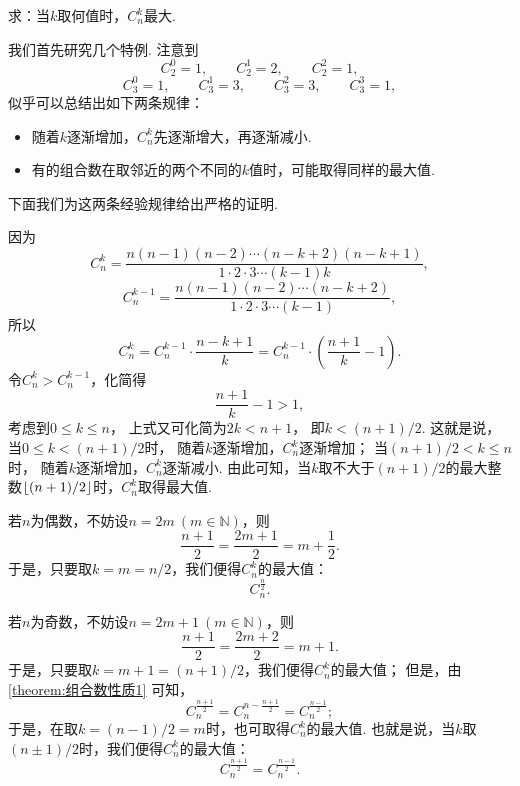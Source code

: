 \begin{example}
求：当\(k\)取何值时，\(C_n^k\)最大.
\begin{solution}
我们首先研究几个特例.
注意到\begin{equation*}
	C_2^0 = 1, \qquad
	C_2^1 = 2, \qquad
	C_2^2 = 1,
\end{equation*}\begin{equation*}
	C_3^0 = 1, \qquad
	C_3^1 = 3, \qquad
	C_3^2 = 3, \qquad
	C_3^3 = 1,
\end{equation*}
似乎可以总结出如下两条规律：
\begin{itemize}
	\item 随着\(k\)逐渐增加，\(C_n^k\)先逐渐增大，再逐渐减小.
	\item 有的组合数在取邻近的两个不同的\(k\)值时，可能取得同样的最大值.
\end{itemize}
下面我们为这两条经验规律给出严格的证明.

因为\begin{equation*}
	C_n^k = \frac{n(n-1)(n-2)\dotsm(n-k+2)(n-k+1)}{1\cdot2\cdot3\dotsm(k-1)k},
\end{equation*}\begin{equation*}
	C_n^{k-1} = \frac{n(n-1)(n-2)\dotsm(n-k+2)}{1\cdot2\cdot3\dotsm(k-1)},
\end{equation*}
所以\begin{equation*}
	C_n^k = C_n^{k-1} \cdot \frac{n-k+1}{k}
	= C_n^{k-1} \cdot \left( \frac{n+1}{k} - 1 \right).
\end{equation*}
令\(C_n^k > C_n^{k-1}\)，化简得\begin{equation*}
	\frac{n+1}{k} - 1 > 1,
\end{equation*}
考虑到\(0 \leq k \leq n\)，
上式又可化简为\(2k < n+1\)，
即\(k < (n+1)/2\).
这就是说，当\(0 \leq k < (n+1)/2\)时，
随着\(k\)逐渐增加，\(C_n^k\)逐渐增加；
当\((n+1)/2 < k \leq n\)时，
随着\(k\)逐渐增加，\(C_n^k\)逐渐减小.
由此可知，当\(k\)取不大于\((n+1)/2\)的最大整数\(\lfloor(n+1)/2\rfloor\)时，\(C_n^k\)取得最大值.

若\(n\)为偶数，不妨设\(n = 2m\ (m\in\mathbb{N})\)，则\begin{equation*}
	\frac{n+1}{2} = \frac{2m+1}{2}
	= m+\frac{1}{2}.
\end{equation*}
于是，只要取\(k = m = n/2\)，我们便得\(C_n^k\)的最大值：\begin{equation*}
	C_n^{\frac{n}{2}}.
\end{equation*}

若\(n\)为奇数，不妨设\(n = 2m+1\ (m\in\mathbb{N})\)，则\begin{equation*}
	\frac{n+1}{2} = \frac{2m+2}{2} = m+1.
\end{equation*}
于是，只要取\(k = m+1 = (n+1)/2\)，我们便得\(C_n^k\)的最大值；
但是，由\cref{theorem:组合数性质1} 可知，\begin{equation*}
	C_n^{\frac{n+1}{2}}
	= C_n^{n-\frac{n+1}{2}}
	= C_n^{\frac{n-1}{2}};
\end{equation*}
于是，在取\(k = (n-1)/2 = m\)时，也可取得\(C_n^k\)的最大值.
也就是说，当\(k\)取\((n\pm1)/2\)时，我们便得\(C_n^k\)的最大值：\begin{equation*}
	C_n^{\frac{n+1}{2}}
	= C_n^{\frac{n-1}{2}}.
\end{equation*}


\end{solution}
\end{example}
